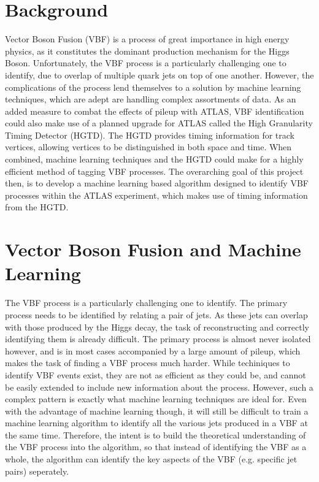 \documentclass[paper=a4,fontsize=12pt]{article}
\begin{document}
\section*{Background}
    Vector Boson Fusion (VBF) is a process of great importance in high energy physics, as it constitutes the dominant production mechanism for the Higgs Boson. Unfortunately, the VBF process is a particularly challenging one to identify, due to overlap of multiple quark jets on top of one another. However, the complications of the process lend themselves to a solution by machine learning techniques, which are adept are handling complex assortments of data. As an added measure to combat the effects of pileup with ATLAS, VBF identification could also make use of a planned upgrade for ATLAS called the High Granularity Timing Detector (HGTD). The HGTD provides timing information for track vertices, allowing vertices to be distinguished in both space and time. When combined, machine learning techniques and the HGTD could make for a highly efficient method of tagging VBF processes. The overarching goal of this project then, is to develop a machine learning based algorithm designed to identify VBF processes within the ATLAS experiment, which makes use of timing information from the HGTD.



\section*{Vector Boson Fusion and Machine Learning}
    The VBF process is a particularly challenging one to identify. The primary process needs to be identified by relating a pair of jets. As these jets can overlap with those produced by the Higgs decay, the task of reconstructing and correctly identifying them is already difficult. The primary process is almost never isolated however, and is in most cases accompanied by a large amount of pileup, which makes the task of finding a VBF process much harder. While techiniques to identify VBF events exist, they are not as efficient as they could be, and cannot be easily extended to include new information about the process. However, such a complex pattern is exactly what machine learning techniques are ideal for. Even with the advantage of machine learning though, it will still be difficult to train a machine learning algorithm to identify all the various jets produced in a VBF at the same time. Therefore, the intent is to build the theoretical understanding of the VBF process into the algorithm, so that instead of identifying the VBF as a whole, the algorithm can identify the key aspects of the VBF (e.g. specific jet pairs) seperately.
\end{document}
